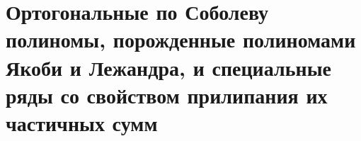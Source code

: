 \chapter{Ортогональные по Соболеву полиномы, порожденные полиномами Якоби и Лежандра, и специальные ряды со свойством прилипания их частичных сумм }






